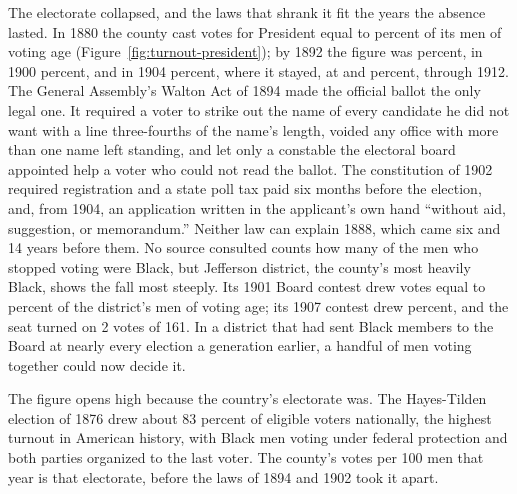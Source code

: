 The electorate collapsed, and the laws that shrank it fit the years the absence
lasted. In 1880 the county cast votes for President equal to
\turnoutEighteenEighty{} percent of its men of voting age
(Figure~\ref{fig:turnout-president}); by 1892 the figure was
\turnoutEighteenNinetyTwo{} percent, in 1900 \turnoutNineteenHundred{} percent,
and in 1904 \turnoutNineteenFour{} percent, where it stayed, at
\turnoutNineteenEight{} and \turnoutNineteenTwelve{} percent, through 1912.
The General Assembly's Walton Act of 1894 made the
official ballot the only legal one. It required a voter to strike out the name
of every candidate he did not want with a line three-fourths of the name's
length, voided any office with more than one name left standing, and let only a
constable the electoral board appointed help a voter who could not read the
ballot.\autocite[secs.~3, 11, 15]{waltonact1894} The constitution of 1902
required registration and a state poll tax paid six months before the election,
and, from 1904, an application written in the applicant's own hand ``without
aid, suggestion, or memorandum.''\autocite[art.~II, secs.~18--21]{vaconstitution1902}
Neither law can explain 1888, which came six and 14 years before them. No source
consulted counts how many of the men who stopped voting were Black, but Jefferson
district, the county's most heavily Black, shows the fall most steeply. Its
1901 Board contest drew votes equal to \boardTurnoutJeffersonNineteenOne{}
percent of the district's men of voting age; its 1907 contest drew
\boardTurnoutJeffersonNineteenSeven{} percent, and the seat turned on 2 votes
of 161. In a district that had sent
Black members to the Board at nearly every election a generation earlier, a
handful of men voting together could now decide it.

The figure opens high because the country's electorate was. The Hayes-Tilden
election of 1876 drew about 83 percent of eligible voters nationally, the
highest turnout in American history, with Black men voting under federal
protection and both parties organized to the last voter.\autocite{burnham2016turnout}
The county's \turnoutEighteenSeventySix{} votes per 100 men that year
is that electorate, before the laws of 1894 and 1902 took it apart.

